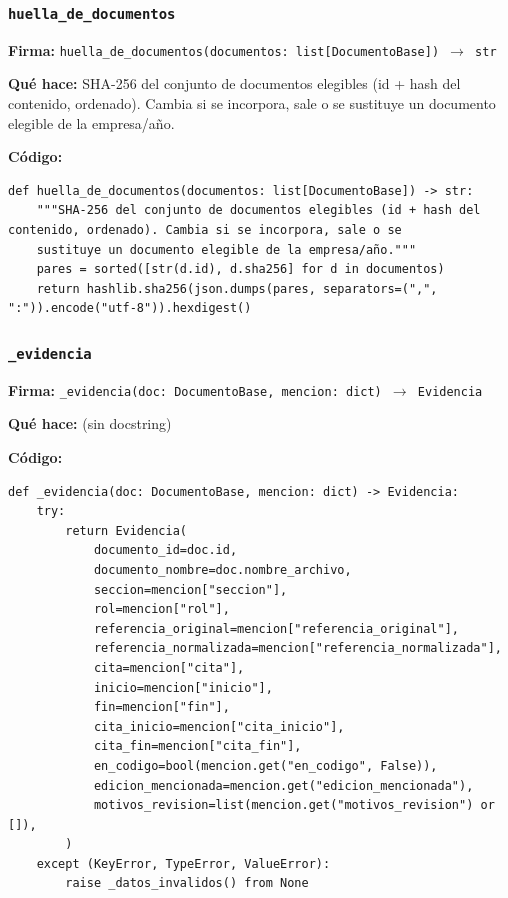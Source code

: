 \documentclass[11pt,a4paper]{article}
\begin{document}
\subsubsection*{\texttt{huella\_de\_documentos}}
\textbf{Firma:} \texttt{huella\_de\_documentos(documentos: list[DocumentoBase]) $\rightarrow$ str}

\textbf{Qué hace:} SHA-256 del conjunto de documentos elegibles (id + hash del contenido, ordenado). Cambia si se incorpora, sale o se
sustituye un documento elegible de la empresa/año.

\textbf{Código:}
\begin{lstlisting}
def huella_de_documentos(documentos: list[DocumentoBase]) -> str:
    """SHA-256 del conjunto de documentos elegibles (id + hash del contenido, ordenado). Cambia si se incorpora, sale o se
    sustituye un documento elegible de la empresa/año."""
    pares = sorted([str(d.id), d.sha256] for d in documentos)
    return hashlib.sha256(json.dumps(pares, separators=(",", ":")).encode("utf-8")).hexdigest()
\end{lstlisting}

\subsubsection*{\texttt{\_evidencia}}
\textbf{Firma:} \texttt{\_evidencia(doc: DocumentoBase, mencion: dict) $\rightarrow$ Evidencia}

\textbf{Qué hace:} (sin docstring)

\textbf{Código:}
\begin{lstlisting}
def _evidencia(doc: DocumentoBase, mencion: dict) -> Evidencia:
    try:
        return Evidencia(
            documento_id=doc.id,
            documento_nombre=doc.nombre_archivo,
            seccion=mencion["seccion"],
            rol=mencion["rol"],
            referencia_original=mencion["referencia_original"],
            referencia_normalizada=mencion["referencia_normalizada"],
            cita=mencion["cita"],
            inicio=mencion["inicio"],
            fin=mencion["fin"],
            cita_inicio=mencion["cita_inicio"],
            cita_fin=mencion["cita_fin"],
            en_codigo=bool(mencion.get("en_codigo", False)),
            edicion_mencionada=mencion.get("edicion_mencionada"),
            motivos_revision=list(mencion.get("motivos_revision") or []),
        )
    except (KeyError, TypeError, ValueError):
        raise _datos_invalidos() from None
\end{lstlisting}
\end{document}
